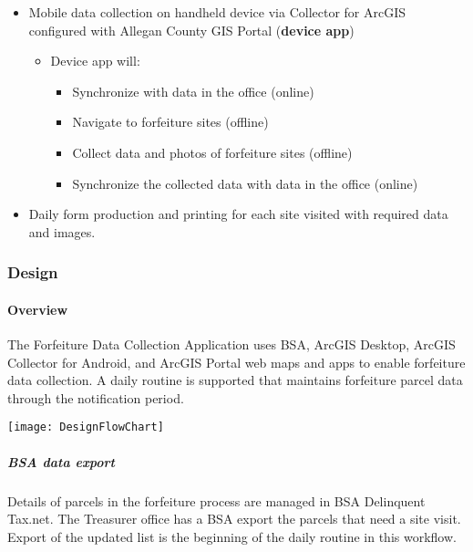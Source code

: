 \documentclass[class=article , crop=false, titlepage, twoside, multi={itemize, figure, verbatim}, float=false]{standalone}
\begin{document}
\begin{itemize} %

\item Mobile data collection on handheld device via Collector for ArcGIS configured with Allegan County GIS Portal  (\textbf{device app})

\begin{itemize} %

\item Device app will:

\begin{itemize} %

\item Synchronize with data in the office (online)
\item Navigate to forfeiture sites (offline)
\item Collect data and photos of forfeiture sites (offline)
\item Synchronize the collected data with data in the office (online)
\end{itemize} %

\end{itemize} %

\item Daily form production and printing for each site visited with required data and images.

\end{itemize} %

\clearpage
\subsubsection{Design}

\paragraph{Overview}The Forfeiture Data Collection Application uses BSA, ArcGIS Desktop, ArcGIS Collector for Android, and ArcGIS Portal web maps and apps to enable forfeiture data collection.  A daily routine is supported that maintains forfeiture parcel data through the notification period.
\begin{center}
    \texttt{[image: DesignFlowChart]}
    
\end{center}


\subparagraph{BSA data export}Details of parcels in the forfeiture process are managed in BSA Delinquent Tax.net.  The Treasurer office has a BSA export the parcels that need a site visit.  Export of the updated list is the beginning of the daily routine in this workflow.
\end{document}

